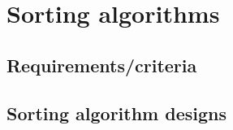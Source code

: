 %
\section{Sorting algorithms}

\subsection{Requirements/criteria}

\subsection{Sorting algorithm designs}
